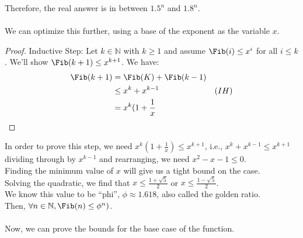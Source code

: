 \documentclass{article}
\begin{document}
Therefore, the real answer is in between $1.5^n$ and $1.8^n$.\\
\\
We can optimize this further, using a base of the exponent as the variable $x$.
\begin{proof}
Inductive Step: Let $k \in \mathbb{N}$ with $k \geq 1$ and assume $\Fib(i) \leq x^i$ for all $i \leq k$. We'll show $\Fib(k + 1) \leq x^{k + 1}$. We have:
\begin{align*}
    \Fib(k + 1) & = \Fib(K) + \Fib(k - 1)\\
    & \leq x^k + x^{k - 1} & (IH)\\
    & = x^k(1 + \frac{1}{x}
\end{align*}
\end{proof}
In order to prove this step, we need $x^k(1 + \frac{1}{x}) \leq x^{k + 1}$, i.e., $x^k + x^{k - 1} \leq x^{k + 1}$ dividing through by $x^{k - 1}$ and rearranging,  we need $x^2 - x - 1 \leq 0$.\\
Finding the minimum value of $x$ will give us a tight bound on the case.\\
Solving the quadratic, we find that $x \leq \frac{1 + \sqrt{5}}{2}$ or $x \leq \frac{1 - \sqrt{5}}{2}$.\\
We know this value to be ``phi'', $\phi \approx 1.618$, also called the golden ratio.\\
Then, $\forall n \in \mathbb{N}, \Fib(n) \leq \phi^n)$.\\
\\
Now, we can prove the bounds for the base case of the function.
\end{document}
